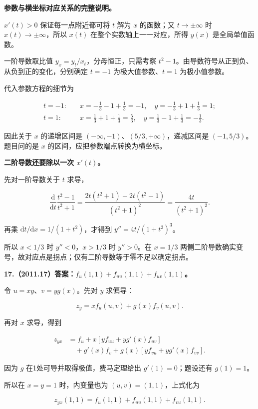 \documentclass[UTF8,11pt,fontset=windows]{ctexart}
\begin{document}
\textbf{参数与横坐标对应关系的完整说明。}

$x'(t)>0$ 保证每一点附近都可将 $t$ 解为 $x$ 的函数；又 $t\to\pm\infty$ 时 $x(t)\to\pm\infty$，所以 $x(t)$ 在整个实数轴上一一对应，所得 $y(x)$ 是全局单值函数。

一阶导数取比值 $y_x=y_t/x_t$，分母恒正，只需考察 $t^2-1$。由导数符号从正到负、从负到正的变化，分别确定 $t=-1$ 为极大值参数、$t=1$ 为极小值参数。

代入参数方程的细节为

$$
\begin{aligned}
t=-1:&\quad x=-\frac13-1+\frac13=-1,
\quad y=-\frac13+1+\frac13=1;\\
t=1:&\quad x=\frac13+1+\frac13=\frac53,
\quad y=\frac13-1+\frac13=-\frac13.
\end{aligned}
$$

因此关于 $x$ 的递增区间是 $(-\infty,-1)$、$(5/3,+\infty)$，递减区间是 $(-1,5/3)$。题目问的是 $x$ 的区间，应把参数端点转换为横坐标。

\textbf{二阶导数还要除以一次 $x'(t)$。}

先对一阶导数关于 $t$ 求导，

$$
\frac{\mathrm d}{\mathrm dt}\frac{t^2-1}{t^2+1}
=\frac{2t(t^2+1)-2t(t^2-1)}{(t^2+1)^2}
=\frac{4t}{(t^2+1)^2}.
$$

再乘 $\mathrm dt/\mathrm dx=1/(1+t^2)$，才得到 $y''=4t/(1+t^2)^3$。

所以 $x<1/3$ 时 $y''<0$，$x>1/3$ 时 $y''>0$。在 $x=1/3$ 两侧二阶导数确实变号，故对应点是拐点；仅有二阶导数等于零不足以确定拐点。

\clearpage

\textbf{17.（2011.17）答案：$f_u(1,1)+f_{uu}(1,1)+f_{uv}(1,1)$。}

令 $u=xy$、$v=yg(x)$。先对 $y$ 求偏导：

$$
z_y=xf_u(u,v)+g(x)f_v(u,v).
$$

再对 $x$ 求导，得到

$$
\begin{aligned}
z_{yx}&=f_u+x[yf_{uu}+yg'(x)f_{uv}]\\
&\quad+g'(x)f_v+g(x)[yf_{vu}+yg'(x)f_{vv}].
\end{aligned}
$$

因为 $g$ 在1处可导并取得极值，费马定理给出 $g'(1)=0$；题设还有 $g(1)=1$。

所以在 $x=y=1$ 时，内变量也为 $(u,v)=(1,1)$，上式化为

$$
z_{yx}(1,1)=f_u(1,1)+f_{uu}(1,1)+f_{vu}(1,1).
$$
\end{document}
